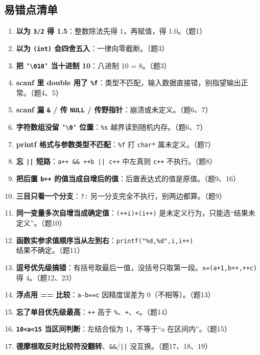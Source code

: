 \documentclass[UTF8,zihao=-4,a4paper]{ctexart}
\begin{document}
\subsection{易错点清单}
\begin{yicuodian}
\begin{enumerate}
  \item \textbf{以为 \texttt{3/2} 得 1.5}：整数除法先得 1，再赋值，得 1.0。（题1）
  \item \textbf{以为 \texttt{(int)} 会四舍五入}：一律向零截断。（题3）
  \item \textbf{把 \texttt{'\textbackslash 010'} 当十进制 10}：八进制 10 = 8。（题3）
  \item \textbf{scanf 里 double 用了 \texttt{\%f}}：类型不匹配，输入数据直接错，别指望输出正常。（题4、5）
  \item \textbf{scanf 漏 \texttt{\&} / 传 \texttt{NULL} / 传野指针}：崩溃或未定义。（题6、7）
  \item \textbf{字符数组没留 \texttt{'\textbackslash 0'} 位置}：\texttt{\%s} 越界读到随机内存。（题6、7）
  \item \textbf{printf 格式与参数类型不匹配}：\texttt{\%f} 打 \texttt{char*} 属未定义。（题7）
  \item \textbf{忘 \texttt{||} 短路}：\texttt{a++ \&\& ++b || c++} 中左真则 \texttt{c++} 不执行。（题8）
  \item \textbf{把后置 \texttt{b++} 的值当成自增后的值}：后置表达式的值是原值。（题9、16）
  \item \textbf{三目只看一个分支}：\texttt{?:} 另一分支完全不执行，别两边都算。（题9）
  \item \textbf{同一变量多次自增当成确定值}：\texttt{(++i)+(i++)} 是未定义行为，只能选“结果未定义”。（题10）
  \item \textbf{函数实参求值顺序当从左到右}：\texttt{printf("\%d,\%d",i,i++)} 结果不确定。（题11）
  \item \textbf{逗号优先级搞错}：有括号取最后一值，没括号只取第一段。\texttt{x=(a+1,b++,++c)} 得 4。（题12、23）
  \item \textbf{浮点用 == 比较}：\texttt{a-b==c} 因精度误差为 0（不相等）。（题13）
  \item \textbf{忘了单目优先级最高}：\texttt{++} 高于 \texttt{\%}、\texttt{+}、\texttt{<}。（题14）
  \item \textbf{\texttt{10<a<15} 当区间判断}：左结合恒为 1，不等于“a 在区间内”。（题15）
  \item \textbf{德摩根取反时比较符没翻转}、\texttt{\&\&}/\texttt{||} 没互换。（题17、18、19）

\end{enumerate}
\end{yicuodian}
\end{document}
